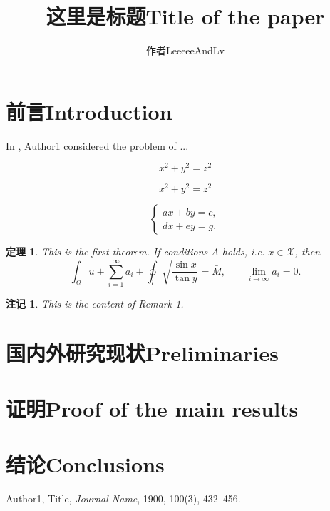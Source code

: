 \documentclass{article}
\title{这里是标题Title of the paper}
\author{作者LeeeeeAndLv}
\date{}
\newtheorem{thm}{定理}
\newtheorem{rmk}{注记}[section]
\begin{document}
	\maketitle
	
	\section{前言Introduction}
	
	In \cite{Au1900}, Author1 considered the problem of ...
	
	\begin{equation*}
		x^2 + y^2 = z^2
	\end{equation*}
	
	\begin{equation}\label{eq:GouGuThm}
		x^2 + y^2 = z^2
	\end{equation}
	
	\[
	\left\{
	\begin{aligned}
		a x + b y = c, \\
		d x + e y = g.
	\end{aligned}
	\right.
	\]
	
	\begin{thm}
		This is the first theorem. If conditions $A$ holds, i.e. $x\in \mathcal{X}$, then
		\[
		\int_\Omega u + \sum_{i=1}^\infty a_i + \oint_l \sqrt{\frac{\sin x}{\tan y}} = \bar{M}, \qquad \lim_{i\to \infty} a_i = 0.
		\]
	\end{thm}
	
	\begin{rmk}
		This is the content of Remark 1. 
	\end{rmk}
	
	
	\section{国内外研究现状Preliminaries}
	
	\section{证明Proof of the main results}
	
	\section{结论Conclusions}
	
	\begin{thebibliography}{99}
		Author1, Title, {\it Journal Name}, 1900, 100(3), 432--456.  
	\end{thebibliography}
	
\end{document}
